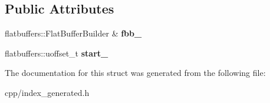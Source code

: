 \subsection*{Public Attributes}
\begin{DoxyCompactItemize}
\item 
\mbox{\label{structquantra_1_1IndexBuilder_a1f6e6b00dc27a6073135e314935dd654}} 
flatbuffers\+::\+Flat\+Buffer\+Builder \& {\bfseries fbb\+\_\+}
\item 
\mbox{\label{structquantra_1_1IndexBuilder_ab3d298583090dd7dd26676e0818d8828}} 
flatbuffers\+::uoffset\+\_\+t {\bfseries start\+\_\+}
\end{DoxyCompactItemize}


The documentation for this struct was generated from the following file\+:\begin{DoxyCompactItemize}
\item 
cpp/index\+\_\+generated.\+h\end{DoxyCompactItemize}
